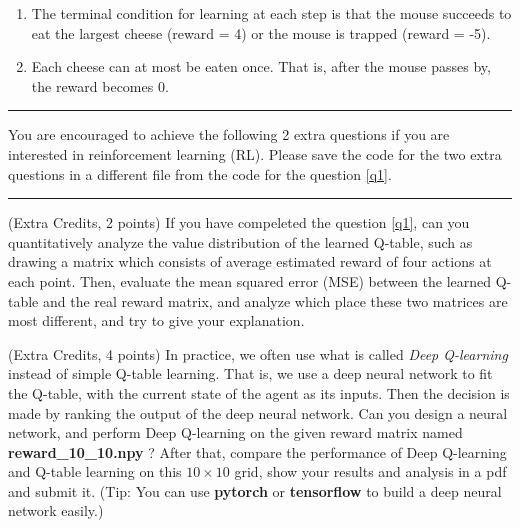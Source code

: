\documentclass[a4paper, 12pt, answers]{exam}
\begin{document}
\begin{questions}
\begin{enumerate}
\item The terminal condition for learning at each step is that the mouse succeeds to eat the largest cheese (reward = 4) or the mouse is trapped (reward = -5).

\item Each cheese can at most be eaten once. That is, after the mouse passes by, the reward becomes 0.

\end{enumerate}


\begin{flushleft}
\hrule
You are encouraged to achieve the following 2 extra questions if you are interested in reinforcement learning (RL).
Please save the code for the two extra questions in a different file from the code for the question \ref{q1}.
\hrule
\end{flushleft}


\question (Extra Credits, 2 points)  If you have compeleted the question \ref{q1}, can you quantitatively analyze the value distribution of the learned Q-table, such as drawing a matrix which consists of average estimated reward of four actions at each point. Then, evaluate the mean squared error (MSE) between the learned Q-table and the real reward matrix, and analyze which place these two matrices are most different, and try to give your explanation.

\question (Extra Credits, 4 points)  In practice, we often use what is called \emph{Deep Q-learning} instead of simple Q-table learning. That is, we use a deep neural network to fit the Q-table, with the current state of the agent as its inputs. Then the decision is made by ranking the output of the deep neural network. Can you design a neural network, and perform Deep Q-learning on the given reward matrix named \textbf{reward\_10\_10.npy} ? After that, compare the performance of Deep Q-learning and Q-table learning on this $10\times 10$ grid, show your results and analysis in a pdf and submit it. (Tip: You can use \textbf{pytorch} or \textbf{tensorflow} to build a deep neural network easily.)


\end{questions}
\end{document}
